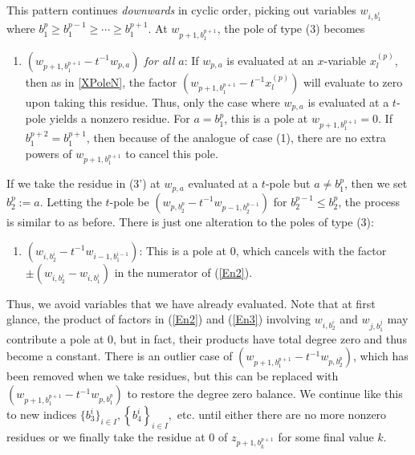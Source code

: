 \documentclass{amsart}
\theoremstyle{remark}
\numberwithin{thm}{section}
\numberwithin{equation}{section}
\begin{document}
This pattern continues \textit{downwards} in cyclic order, picking out variables $w_{i, b_1^i}$ where $b_1^p\ge b_1^{p-1}\ge\cdots\ge b_1^{p+1}$.
At $w_{p+1,b_1^{p+1}}$, the pole of type (3) becomes
\begin{enumerate}
\item[(3')] \textit{$(w_{p+1,b_1^{p+1}}-t^{-1}w_{p,a})$ for all $a$}: If $w_{p,a}$ is evaluated at an $x$-variable $x^{(p)}_{l}$, then as in \ref{XPoleN}, the factor
$(w_{p+1,b_1^{p+1}}-t^{-1}x^{(p)}_{l})$ will evaluate to zero upon taking this residue.
Thus, only the case where $w_{p,a}$ is evaluated at a $t$-pole yields a nonzero residue.
For $a=b_1^p$, this is a pole at $w_{p+1,b_1^{p+1}}=0$.
If $b_{1}^{p+2}=b_1^{p+1}$, then because of the analogue of case (1), there are no extra powers of $w_{p+1,b_1^{p+1}}$ to cancel this pole.
\end{enumerate}

If we take the residue in (3') at $w_{p,a}$ evaluated at a $t$-pole but $a\not=b_1^p$, then we set $b_2^p:=a$.
Letting the $t$-pole be $(w_{p,b_2^p}-t^{-1}w_{p-1,b_2^{p-1}})$ for $b_2^{p-1}\le b_2^p$, the process is similar to as before.
There is just one alteration to the poles of type (3):
\begin{enumerate}
\item[(3'')]\textit{$(w_{i, b_2^{i}}-t^{-1}w_{i-1,b_1^{i-1}})$}: This is a pole at $0$, which cancels with the factor $\pm(w_{i, b_2^i}- w_{i, b_1^i})$ in the numerator of (\ref{En2}).
\end{enumerate}
Thus, we avoid variables that we have already evaluated.
Note that at first glance, the product of factors in (\ref{En2}) and (\ref{En3}) involving $w_{i, b_2^i}$ and $w_{j,b_1^j}$ may contribute a pole at $0$, but in fact, their products have total degree zero and thus become a constant.
There is an outlier case of $(w_{p+1,b_1^{p+1}}-t^{-1}w_{p,b_{2}^p})$, which has been removed when we take residues, but this can be replaced with $(w_{p+1,b_1^{p+1}}-t^{-1}w_{p,b_{1}^p})$ to restore the degree zero balance.
We continue like this to new indices $\{b_3^i\}_{i\in I}, \left\{ b_{4}^i \right\}_{i\in I},$ etc. until either there are no more nonzero residues or we finally take the residue at $0$ of $z_{p+1, b_k^{p+1}}$ for some final value $k$. 
\end{document}
